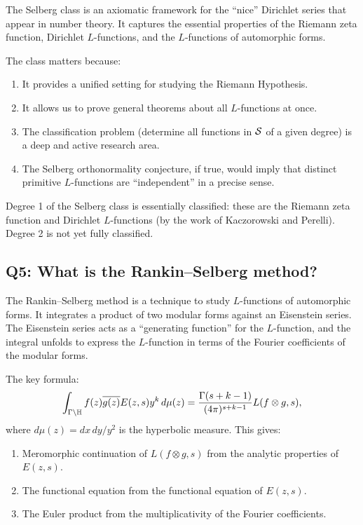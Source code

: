 The Selberg class is an axiomatic framework for the ``nice'' Dirichlet series that appear in number theory. It captures the essential properties of the Riemann zeta function, Dirichlet \(L\)-functions, and the \(L\)-functions of automorphic forms.

The class matters because:
\begin{enumerate}
    \item It provides a unified setting for studying the Riemann Hypothesis.
    \item It allows us to prove general theorems about all \(L\)-functions at once.
    \item The classification problem (determine all functions in \(\mathcal{S}\) of a given degree) is a deep and active research area.
    \item The Selberg orthonormality conjecture, if true, would imply that distinct primitive \(L\)-functions are ``independent'' in a precise sense.
\end{enumerate}

Degree 1 of the Selberg class is essentially classified: these are the Riemann zeta function and Dirichlet \(L\)-functions (by the work of Kaczorowski and Perelli). Degree 2 is not yet fully classified.

\subsection*{Q5: What is the Rankin--Selberg method?}

The Rankin--Selberg method is a technique to study \(L\)-functions of automorphic forms. It integrates a product of two modular forms against an Eisenstein series. The Eisenstein series acts as a ``generating function'' for the \(L\)-function, and the integral unfolds to express the \(L\)-function in terms of the Fourier coefficients of the modular forms.

The key formula:
\[
\int_{\Gamma \backslash \mathbb{H}} f(z) \overline{g(z)} E(z,s) y^k \, d\mu(z) = \frac{\Gamma(s+k-1)}{(4\pi)^{s+k-1}} L(f \otimes g, s),
\]
where \(d\mu(z) = dx\,dy/y^2\) is the hyperbolic measure. This gives:
\begin{enumerate}
    \item Meromorphic continuation of \(L(f \otimes g, s)\) from the analytic properties of \(E(z,s)\).
    \item The functional equation from the functional equation of \(E(z,s)\).
    \item The Euler product from the multiplicativity of the Fourier coefficients.
\end{enumerate}

